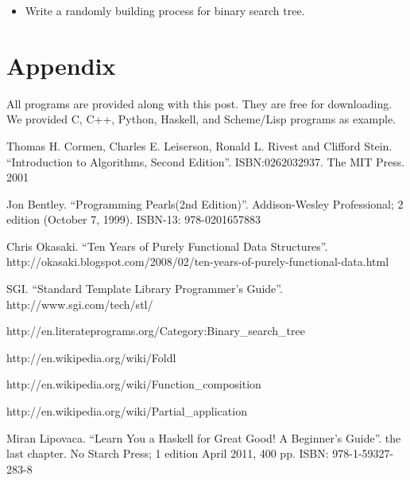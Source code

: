 \documentclass[UTF8]{article}
\begin{document}
\begin{Exercise}

\begin{itemize}
\item Write a randomly building process for binary search tree.
\end{itemize}

\end{Exercise}

\section{Appendix} \label{appendix}
All programs are provided along with this post. They are free for downloading.
We provided C, C++, Python, Haskell, and Scheme/Lisp programs as example.

\begin{thebibliography}{99}

Thomas H. Cormen, Charles E. Leiserson, Ronald L. Rivest and Clifford Stein.
``Introduction to Algorithms, Second Edition''. ISBN:0262032937. The MIT Press. 2001

Jon Bentley. ``Programming Pearls(2nd Edition)''. Addison-Wesley Professional; 2 edition (October 7, 1999). ISBN-13: 978-0201657883

Chris Okasaki. ``Ten Years of Purely Functional Data Structures''. http://okasaki.blogspot.com/2008/02/ten-years-of-purely-functional-data.html

SGI. ``Standard Template Library Programmer's Guide''. http://www.sgi.com/tech/stl/

http://en.literateprograms.org/Category:Binary\_search\_tree

http://en.wikipedia.org/wiki/Foldl

http://en.wikipedia.org/wiki/Function\_composition

http://en.wikipedia.org/wiki/Partial\_application

Miran Lipovaca. ``Learn You a Haskell for Great Good! A Beginner's Guide''. the last chapter. No Starch Press; 1 edition April 2011, 400 pp. ISBN: 978-1-59327-283-8

\end{thebibliography}

\ifx\wholebook\relax\else
\end{document}
